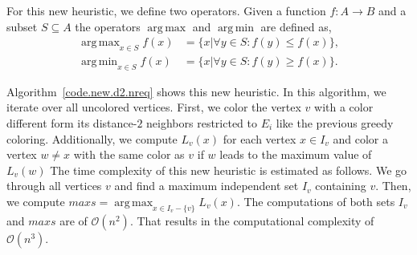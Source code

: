 \documentclass[12pt, twoside,a4paper,toc=bibliography]{scrbook}
\DeclareMathOperator*{\argmin}{arg\,min}
\DeclareMathOperator*{\argmax}{arg\,max}
\newcommand{\coderef}[1]{Algorithm~\protect\ref{#1}}
\newcommand{\nreq}{L}
\begin{document}
For this new heuristic, we define two operators.
Given a function $f:A\rightarrow B$ and a subset $S\subseteq A$
the operators $\argmax$ and $\argmin$ are defined as,
\begin{equation*}
\begin{split}
\argmax_{x\in S} f(x) &= \{ x | \forall y\in S: f(y) \leq f(x)\}, \\
\argmin_{x\in S} f(x) &= \{ x | \forall y\in S: f(y) \geq f(x)\}.
\end{split}
\end{equation*}

\coderef{code.new.d2.nreq} shows this new heuristic.
In this algorithm, we iterate over all uncolored vertices.
First, we color the vertex $v$ with a color different form
its distance-$2$ neighbors restricted to $E_i$ like the previous greedy coloring.
Additionally, we compute $\nreq_v(x)$ for each vertex $x\in I_v$
and color a vertex $w\neq x$ with the same color as $v$ 
if $w$ leads to the maximum value of $\nreq_v(w)$
The time complexity of this new heuristic is estimated as follows.
We go through all vertices $v$
and find a maximum independent set $I_v$ containing $v$.
Then, we compute $maxs = \argmax_{x\in I_v - \{v\}} \nreq_v (x)$.
The computations of both sets $I_v$ and $maxs$ are of $\mathcal{O}(n^2)$.
That results in the computational complexity of $\mathcal{O}(n^3)$.
\end{document}
